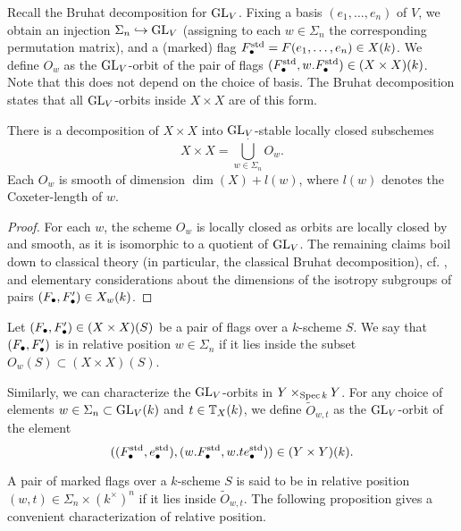 \documentclass[../main.tex]{subfiles}
\begin{document}
Recall the Bruhat decomposition for $\operatorname{GL}_V$.
Fixing a basis $(e_1, \dots, e_n)$ of $V$, we obtain an injection
$\Sigma_n \hookrightarrow \operatorname{GL}_V$ (assigning to each $w \in \Sigma_n$ the corresponding
permutation matrix), and a (marked) flag $F_\bullet^{\mathrm{std}} = F(e_1, \dots, e_n) \in
X(k)$. We define $O_w$ as the $\operatorname{GL}_V$-orbit
of the pair of flags $(F_\bullet^{\mathrm{std}}, w.F_\bullet^{\mathrm{std}}) \in (X \times X)(k)$.
Note that this does not depend on the choice of basis.
The Bruhat decomposition states that all $\operatorname{GL}_V$-orbits inside $X \times X$ are of 
this form.

\begin{prop}\label{prop:BruhatDecomp}
  There is a decomposition of 
  $X \times X$ into $\operatorname{GL}_V$-stable locally closed subschemes
  \begin{equation*}
    X \times X = \bigcup_{w \in \Sigma_n}^{\cdot} O_w.
  \end{equation*}
  Each $O_w$ is smooth of dimension $\dim(X) + l(w)$, where $l(w)$ denotes the
  Coxeter-length of $w$.
\begin{proof}
   For each $w$, the scheme $O_w$ is locally closed as orbits are locally
   closed by \cite[Proposition 1.65 b)]{milne2017algebraic} and smooth,
   as it is isomorphic to a quotient of $\operatorname{GL}_V$. The remaining claims
   boil down to classical theory (in particular, the classical Bruhat decomposition),
   cf. \cite[Chapter 21]{milne2017algebraic}, and elementary considerations about 
   the dimensions of the isotropy subgroups of pairs $(F_\bullet, F_\bullet') \in X_w(k)$.
\end{proof}
\end{prop}

Let $(F_\bullet, F_\bullet') \in (X \times X)(S)$ be a pair of flags over a $k$-scheme
$S$. We say that $(F_\bullet,F_\bullet')$ is in relative position 
$w \in \Sigma_n$ if it lies inside the subset $O_w(S) \subset (X \times X)(S)$. 

Similarly, we can characterize the $\operatorname{GL}_V$-orbits in $Y \times_{\operatorname{Spec} k} Y$.
For any choice of elements $w \in \Sigma_n \subset \operatorname{GL}_V(k)$ and $t \in
\mathbb{T}_X(k)$, we define $\tilde O_{w,t}$ as the $\operatorname{GL}_V$-orbit of the element
$$((F_\bullet^{\mathrm{std}}, e_\bullet^{\mathrm{std}}), (w.F_\bullet^{\mathrm{std}}, w.te_\bullet^{\mathrm{std}})) \in (Y
\times Y)(k).$$ 

A pair of marked flags over a $k$-scheme $S$ is said to be in relative position
$(w,t) \in \Sigma_n \times (k^\times)^n$ if it lies inside $\tilde O_{w,t}$.
The following proposition gives a convenient characterization of relative position.
\end{document}
